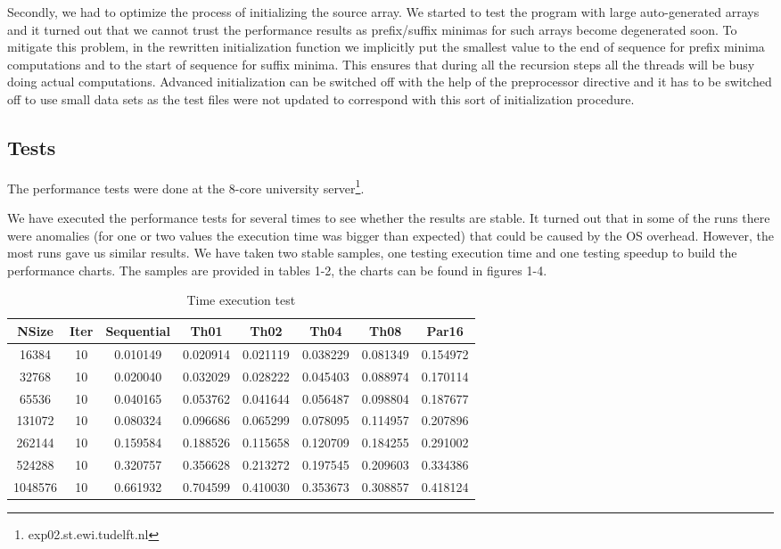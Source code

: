 \documentclass[a4paper,10pt,notitlepage]{article}
\begin{document}
Secondly, we had to optimize the process of initializing the source array. We started to test the program with large auto-generated arrays and it turned out that we cannot trust the performance results as prefix/suffix minimas for such arrays become degenerated soon. To mitigate this problem, in the rewritten initialization function we implicitly put the smallest value to the end of sequence for prefix minima computations and to the start of sequence for suffix minima. This ensures that during all the recursion steps all the threads will be busy doing actual computations. Advanced initialization can be switched off with the help of the preprocessor directive and it has to be switched off to use small data sets as the test files were not updated to correspond with this sort of initialization procedure.

\subsection{Tests}

The performance tests were done at the 8-core university server\footnote{exp02.st.ewi.tudelft.nl}.

We have executed the performance tests for several times to see whether the results are stable. It turned out that in some of the runs there were anomalies (for one or two values the execution time was bigger than expected) that could be caused by the OS overhead. However, the most runs gave us similar results. We have taken two stable samples, one testing execution time and one testing speedup to build the performance charts. The samples are provided in tables 1-2, the charts can be found in figures 1-4.

\begin{table}[!htb]
  \centering
  \begin{tabular}{ | c | c | c | c | c | c | c | c | }
  \hline
NSize &	Iter & Sequential & Th01 & Th02 & Th04 & Th08 & Par16 \\ \hline  
16384 & 10 & 0.010149 & 0.020914 & 0.021119 & 0.038229 & 0.081349 & 0.154972 \\ \hline
32768 & 10 & 0.020040 & 0.032029 & 0.028222 & 0.045403 & 0.088974 & 0.170114 \\ \hline
65536 & 10 & 0.040165 & 0.053762 & 0.041644 & 0.056487 & 0.098804 & 0.187677 \\ \hline
131072 & 10 & 0.080324 & 0.096686 & 0.065299 & 0.078095 & 0.114957 & 0.207896 \\ \hline
262144 & 10 & 0.159584 & 0.188526 & 0.115658 & 0.120709 & 0.184255 & 0.291002 \\ \hline
524288 & 10 & 0.320757 & 0.356628 & 0.213272 & 0.197545 & 0.209603 & 0.334386 \\ \hline
1048576 & 10 & 0.661932 & 0.704599 & 0.410030 & 0.353673 & 0.308857 & 0.418124 \\ \hline
  \end{tabular}
  \caption{Time execution test}
  \end{table}
\end{document}
